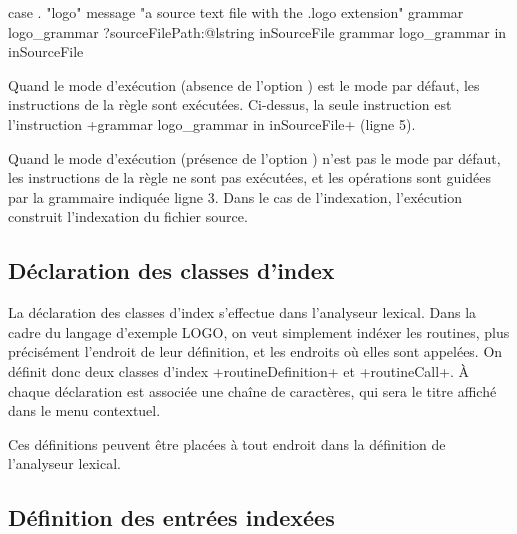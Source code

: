 \begin{galgas}
case . "logo"
message "a source text file with the .logo extension"
grammar logo_grammar
?sourceFilePath:@lstring inSourceFile {
  grammar logo_grammar in inSourceFile
}
\end{galgas}

Quand le mode d'exécution (absence de l'option ) est le mode par défaut, les instructions de la règle sont exécutées. Ci-dessus, la seule instruction est l'instruction \ggs+grammar logo_grammar in inSourceFile+ (ligne 5).

Quand le mode d'exécution (présence de l'option ) n'est pas le mode par défaut, les instructions de la règle ne sont pas exécutées, et les opérations sont guidées par la grammaire indiquée ligne 3. Dans le cas de l'indexation, l'exécution construit l'indexation du fichier source.









\subsection{Déclaration des classes d'index}

La déclaration des classes d'index s'effectue dans l'analyseur lexical. Dans la cadre du langage d'exemple LOGO, on veut simplement indéxer les routines, plus précisément l'endroit de leur définition, et les endroits où elles sont appelées. On définit donc deux classes d'index \ggs+routineDefinition+ et \ggs+routineCall+. À chaque déclaration est associée une chaîne de caractères, qui sera le titre affiché dans le menu contextuel. 


\begin{galgas}
lexique logo_lexique indexing in "INDEXING" {
  ...
indexing routineDefinition : "Routine Definition"
  ...
indexing routineCall : "Routine call"
  ...
\end{galgas}


Ces définitions peuvent être placées à tout endroit dans la définition de l'analyseur lexical.








\subsection{Définition des entrées indexées}

